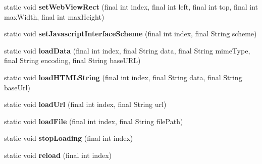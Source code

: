 \begin{DoxyCompactItemize}
static void {\bfseries set\+Web\+View\+Rect} (final int index, final int left, final int top, final int max\+Width, final int max\+Height)
\item 
\mbox{\label{classorg_1_1cocos2dx_1_1lib_1_1Cocos2dxWebViewHelper_aa02c6149bae3e04ad46d309a38063c55}} 
static void {\bfseries set\+Javascript\+Interface\+Scheme} (final int index, final String scheme)
\item 
\mbox{\label{classorg_1_1cocos2dx_1_1lib_1_1Cocos2dxWebViewHelper_ad9ee5df7a17acb63cdf61925cc714019}} 
static void {\bfseries load\+Data} (final int index, final String data, final String mime\+Type, final String encoding, final String base\+U\+RL)
\item 
\mbox{\label{classorg_1_1cocos2dx_1_1lib_1_1Cocos2dxWebViewHelper_aaa4d5d1e351ffe1b673025a310262b83}} 
static void {\bfseries load\+H\+T\+M\+L\+String} (final int index, final String data, final String base\+Url)
\item 
\mbox{\label{classorg_1_1cocos2dx_1_1lib_1_1Cocos2dxWebViewHelper_a8e17cc9ed483b60cdbf5545b6c6921af}} 
static void {\bfseries load\+Url} (final int index, final String url)
\item 
\mbox{\label{classorg_1_1cocos2dx_1_1lib_1_1Cocos2dxWebViewHelper_a83d7495db43553b0f9f2fa3469e66fa3}} 
static void {\bfseries load\+File} (final int index, final String file\+Path)
\item 
\mbox{\label{classorg_1_1cocos2dx_1_1lib_1_1Cocos2dxWebViewHelper_abfc55e99cda3c93b86eb41af7129b058}} 
static void {\bfseries stop\+Loading} (final int index)
\item 
\mbox{\label{classorg_1_1cocos2dx_1_1lib_1_1Cocos2dxWebViewHelper_a003c9047097c1cee147d1f3fba11e61d}} 
static void {\bfseries reload} (final int index)
\item 
\mbox{\label{classorg_1_1cocos2dx_1_1lib_1_1Cocos2dxWebViewHelper_a159dba7d23b24945bf25c40cb3fe1280}} 

\end{DoxyCompactItemize}
